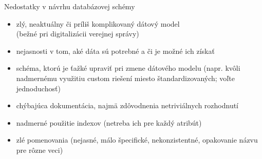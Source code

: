 \documentclass[12pt]{beamer}
\begin{document}
\begin{frame}[fragile]{Nedostatky v návrhu databázovej schémy}
\begin{itemize}
\item zlý, neaktuálny či príliš komplikovaný dátový model\\ (bežné pri digitalizácii verejnej správy)
\item nejasnosti v tom, aké dáta sú potrebné a či je možné ich získať
\item schéma, ktorú je ťažké upraviť pri zmene dátového modelu
      (napr. kvôli nadmernému využitiu custom riešení miesto štandardizovaných; voľte jednoduchosť)
\item chýbajúca dokumentácia, najmä zdôvodnenia netriviálnych rozhodnutí
\item nadmerné použitie indexov (netreba ich  pre každý atribút)
\item zlé pomenovania (nejasné, málo špecifické, nekonzistentné, opakovanie názvu pre rôzne veci)
\end{itemize}
\end{frame}
\end{document}
